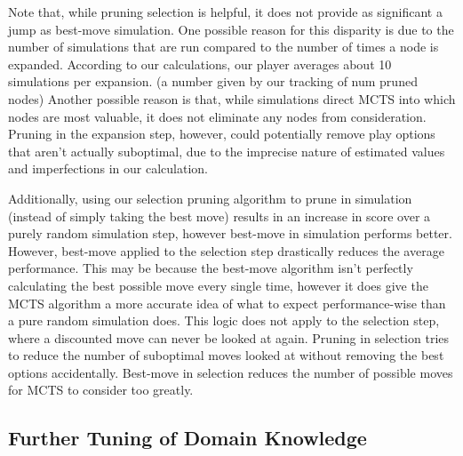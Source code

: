\documentclass[letterpaper]{article}
\begin{document}
Note that, while pruning selection is helpful, it does not provide as significant a jump as best-move simulation. One possible reason for this disparity is due to the number of simulations that are run compared to the number of times a node is expanded. According to our calculations, our player averages about 10 simulations per expansion. (a number given by our tracking of num pruned nodes)  Another possible reason is that, while simulations direct MCTS into which nodes are most valuable, it does not eliminate any nodes from consideration. Pruning in the expansion step, however, could potentially remove play options that aren’t actually suboptimal, due to the imprecise nature of estimated values and imperfections in our calculation.

Additionally, using our selection pruning algorithm to prune in simulation (instead of simply taking the best move) results in an increase in score over a purely random simulation step, however best-move in simulation performs better. However, best-move applied to the selection step drastically reduces the average performance. This may be because the best-move algorithm isn't perfectly calculating the best possible move every single time, however it does give the MCTS algorithm a more accurate idea of what to expect performance-wise than a pure random simulation does. This logic does not apply to the selection step, where a discounted move can never be looked at again. Pruning in selection tries to reduce the number of suboptimal moves looked at without removing the best options accidentally. Best-move in selection reduces the number of possible moves for MCTS to consider too greatly.

\subsection{Further Tuning of Domain Knowledge}


\end{document}
